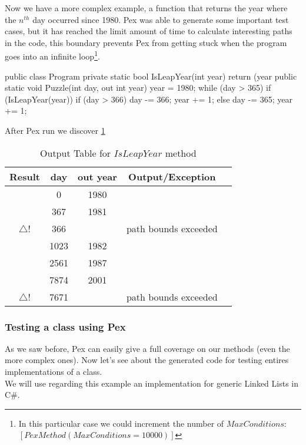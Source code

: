\documentclass[10pt, conference, compsocconf]{IEEEtran}
\newcommand{\checkK}{\color{ForestGreen}\checkmark}
\newcommand{\bigexclaim}{\color{Dandelion}$\bigtriangleup$\hspace{-5.6pt}!}
\begin{document}
Now we have a more complex example, a function that returns the year where the $n^{th}$ day occurred since 1980.
Pex was able to generate some important test cases, but it has reached the limit amount of time to calculate interesting paths in the code,
this boundary prevents Pex from getting stuck when the program goes into an infinite loop\footnote{In this particular case we could increment the number of $MaxConditions$: $[PexMethod(MaxConditions=10000)]$}.

\begin{code}
public class Program {
  private static bool IsLeapYear(int year) {
    return (year %
  }
  public static void Puzzle(int day, out int year) {
    year = 1980;
    while (day > 365) {
      if (IsLeapYear(year)) {
        if (day > 366) {
          day -= 366;
          year += 1;
        }
      } else {
        day -= 365;
        year += 1;
      }
    }
  }
}
\end{code}

After Pex run we discover \ref{tab:leap}

\begin{table}[!ht]
\renewcommand{\arraystretch}{1.3}
\caption{Output Table for $IsLeapYear$ method}
\label{tab:leap}
\centering
\noindent \begin{tabular}{|c|c|c|c|c|}\hline
Result & day & out year & Output/Exception\\\hline
\checkK & 0 & 1980 & \\\hline
\checkK & 367 & 1981 & \\\hline
\bigexclaim & 366 & & path bounds exceeded\\\hline
\checkK & 1023 & 1982 &\\\hline
\checkK & 2561 & 1987 & \\\hline
\checkK & 7874 & 2001 & \\\hline
\bigexclaim &  7671 & & path bounds exceeded\\\hline
\end{tabular}
\end{table}

\subsubsection{Testing a class using Pex}
As we saw before, Pex can easily give a full coverage on our methods (even the more complex ones). Now let's see about the generated code
for testing entires implementations of a class.\\
We will use regarding this example an implementation for generic Linked Lists in C\#.\\
\end{document}
